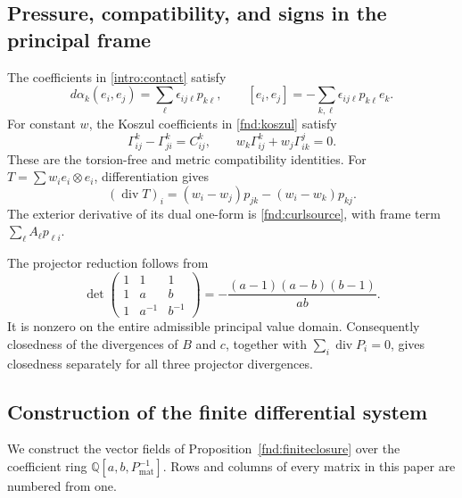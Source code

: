 \documentclass[11pt,a4paper]{article}
\numberwithin{equation}{section}
\theoremstyle{plain}
\theoremstyle{definition}
\theoremstyle{remark}
\begin{document}
\subsection{Pressure, compatibility, and signs in the principal frame}

The coefficients in \eqref{intro:contact} satisfy
\[
 d\alpha_k(e_i,e_j)=\sum_\ell\epsilon_{ij\ell}p_{k\ell},\qquad
 [e_i,e_j]=-\sum_{k,\ell}\epsilon_{ij\ell}p_{k\ell}e_k.
\]
For constant $w$, the Koszul coefficients in \eqref{fnd:koszul} satisfy
\begin{equation}\label{appf:koszulchecks}
 \Gamma^k_{ij}-\Gamma^k_{ji}=C^k_{ij},\qquad
 w_k\Gamma^k_{ij}+w_j\Gamma^j_{ik}=0.
\end{equation}
These are the torsion-free and metric compatibility identities.
For $T=\sum w_i e_i\otimes e_i$, differentiation gives
\[
 (\operatorname{div}T)_i
 =(w_i-w_j)p_{jk}-(w_i-w_k)p_{kj}.
\]
The exterior derivative of its dual one-form is
\eqref{fnd:curlsource}, with frame term $\sum_\ell A_\ell p_{\ell i}$.

The projector reduction follows from
\begin{equation}\label{appf:projectordet}
 \det\begin{pmatrix}1&1&1\\1&a&b\\1&a^{-1}&b^{-1}\end{pmatrix}
 =-\frac{(a-1)(a-b)(b-1)}{ab}.
\end{equation}
It is nonzero on the entire admissible principal value domain. Consequently
closedness of the divergences of $B$ and $c$, together with
$\sum_i\operatorname{div}P_i=0$, gives closedness separately for all
three projector divergences.

\subsection{Construction of the finite differential system}\label{appf:finiteconstruction}
We construct the vector fields of Proposition~\ref{fnd:finiteclosure} over the coefficient ring $\mathbb Q[a,b,P_{\mathrm{mat}}^{-1}]$. Rows and columns of every matrix in this paper are numbered from one.
\end{document}
